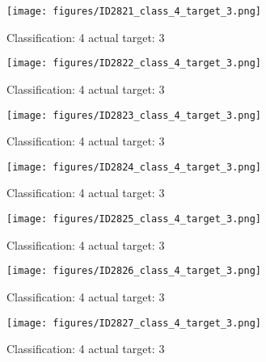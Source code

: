 \begin{figure}[h!]
\begin{center}
\texttt{[image: figures/ID2821\_class\_4\_target\_3.png]}
\end{center}
\caption{ Classification: 4 actual target: 3}
\label{fig:ID2821_class_4_target_3}
\end{figure}
\begin{figure}[h!]
\begin{center}
\texttt{[image: figures/ID2822\_class\_4\_target\_3.png]}
\end{center}
\caption{ Classification: 4 actual target: 3}
\label{fig:ID2822_class_4_target_3}
\end{figure}
\begin{figure}[h!]
\begin{center}
\texttt{[image: figures/ID2823\_class\_4\_target\_3.png]}
\end{center}
\caption{ Classification: 4 actual target: 3}
\label{fig:ID2823_class_4_target_3}
\end{figure}
\begin{figure}[h!]
\begin{center}
\texttt{[image: figures/ID2824\_class\_4\_target\_3.png]}
\end{center}
\caption{ Classification: 4 actual target: 3}
\label{fig:ID2824_class_4_target_3}
\end{figure}
\begin{figure}[h!]
\begin{center}
\texttt{[image: figures/ID2825\_class\_4\_target\_3.png]}
\end{center}
\caption{ Classification: 4 actual target: 3}
\label{fig:ID2825_class_4_target_3}
\end{figure}
\begin{figure}[h!]
\begin{center}
\texttt{[image: figures/ID2826\_class\_4\_target\_3.png]}
\end{center}
\caption{ Classification: 4 actual target: 3}
\label{fig:ID2826_class_4_target_3}
\end{figure}
\begin{figure}[h!]
\begin{center}
\texttt{[image: figures/ID2827\_class\_4\_target\_3.png]}
\end{center}
\caption{ Classification: 4 actual target: 3}
\label{fig:ID2827_class_4_target_3}
\end{figure}
